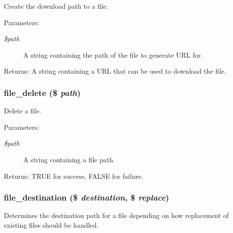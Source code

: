 Create the download path to a file.

\begin{Desc}
\item[Parameters:]
\begin{description}
\item[{\em \$path}]A string containing the path of the file to generate URL for. \end{description}
\end{Desc}
\begin{Desc}
\item[Returns:]A string containing a URL that can be used to download the file. \end{Desc}
\hypertarget{group__file_g58d648a7a057d1e014727c7958935af6}{
\subsubsection[{file\_\-delete}]{\setlength{\rightskip}{0pt plus 5cm}file\_\-delete (\$ {\em path})}}
\label{group__file_g58d648a7a057d1e014727c7958935af6}


Delete a file.

\begin{Desc}
\item[Parameters:]
\begin{description}
\item[{\em \$path}]A string containing a file path. \end{description}
\end{Desc}
\begin{Desc}
\item[Returns:]TRUE for success, FALSE for failure. \end{Desc}
\hypertarget{group__file_g3136d98d6189607e6cba12aaff55c66d}{
\subsubsection[{file\_\-destination}]{\setlength{\rightskip}{0pt plus 5cm}file\_\-destination (\$ {\em destination}, \/  \$ {\em replace})}}
\label{group__file_g3136d98d6189607e6cba12aaff55c66d}


Determines the destination path for a file depending on how replacement of existing files should be handled.

